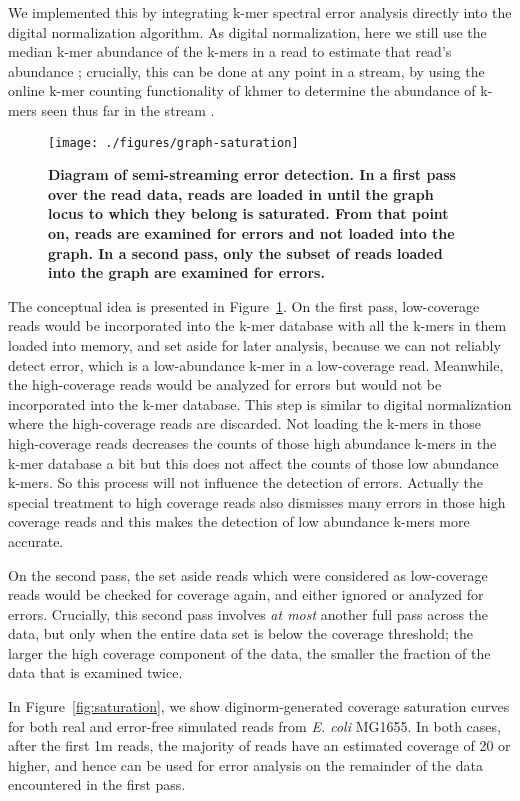 We implemented this by integrating k-mer spectral
error analysis directly into the digital normalization algorithm.
As digital normalization, here we
still use the median k-mer abundance of the k-mers in a read to
estimate that read's abundance \cite{Brown2012}; crucially, this can
be done at any point in a stream, by using the online k-mer counting
functionality of khmer to determine the abundance of k-mers seen thus
far in the stream \cite{Zhang2014}. 


\begin{figure}[!ht]
 \centerline{\texttt{[image: ./figures/graph-saturation]}}
\caption{\bf Diagram of semi-streaming error detection. In a first pass
over the read data, reads are loaded in until the graph locus to which
they belong is saturated.  From that point on, reads are examined for
errors and not loaded into the graph.  In a second pass, only the subset
of reads loaded into the graph are examined for errors.}
\label{fig:concept}
\end{figure}

The conceptual idea is presented in Figure~\ref{fig:concept}.  On the
first pass, low-coverage reads would be incorporated into the k-mer
database with all the k-mers in them loaded into memory, and set aside for later analysis, because we can not reliably detect error, which 
is a low-abundance k-mer in a low-coverage read. 
Meanwhile, the high-coverage reads
would be analyzed for errors but would not be incorporated into the k-mer database.
This step is similar to digital normalization where the high-coverage reads are
discarded. Not loading the k-mers in those high-coverage reads decreases the
counts of those high abundance k-mers in the k-mer database a bit but this
does not affect the counts of those low abundance k-mers. So this process will
not influence the detection of errors. 
Actually the special treatment to high coverage reads also dismisses many errors in
those high coverage reads 
and this makes the detection of low abundance k-mers more accurate.

On the second pass, the set aside reads which were considered as low-coverage reads
would be checked for coverage again, and either ignored or analyzed
for errors.  Crucially, this second pass involves {\em at most}
another full pass across the data, but only when the entire data set
is below the coverage threshold; the larger the high coverage
component of the data, the smaller the fraction of the data that is
examined twice.


In Figure~\ref{fig:saturation}, we show diginorm-generated coverage
saturation curves for both real and error-free simulated reads from
{\em E. coli} MG1655.  In both cases, after the first 1m reads, the
majority of reads have an estimated coverage of 20 or higher, and
hence can be used for error analysis on the remainder of the data
encountered in the first pass.

